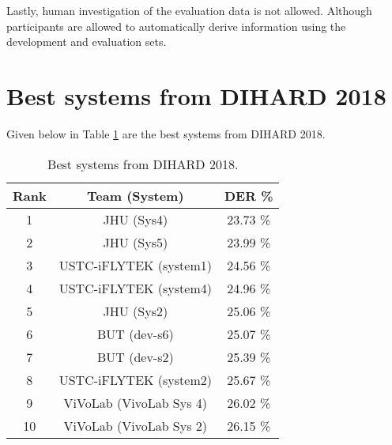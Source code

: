 Lastly, human investigation of the evaluation data is not allowed. Although participants are allowed to automatically derive information using the development and evaluation sets.

\section{Best systems from DIHARD 2018}
Given below in Table \ref{table-dihard-best} are the best systems from DIHARD 2018.

\begin{table}[h]
	\centering
	\begin{tabular}{|c|c|c|}
		\hline
		Rank & Team (System) & DER \% \\
		\hline
		1 & JHU (Sys4) & 23.73 \% \\
		2 & JHU (Sys5) & 23.99 \% \\
		3 & USTC-iFLYTEK (system1) & 24.56 \% \\
		4 & USTC-iFLYTEK (system4)	 & 24.96 \% \\
		5 & JHU (Sys2) & 25.06 \% \\
		6 & BUT (dev-s6) & 25.07 \% \\
		7 & BUT (dev-s2) & 25.39 \% \\
		8 & USTC-iFLYTEK (system2) & 25.67 \% \\
		9 & ViVoLab (VivoLab Sys 4) & 26.02 \% \\
		10 & ViVoLab (VivoLab Sys 2) & 26.15 \% \\
		\hline
	\end{tabular}
	\caption{Best systems from DIHARD 2018.}
	\label{table-dihard-best}
\end{table}
